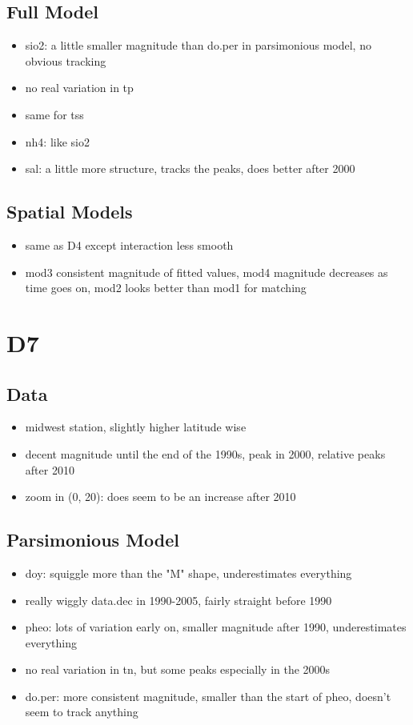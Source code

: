 \documentclass[12pt]{amsart}
\begin{document}
\subsection{Full Model}
\begin{itemize}
\item sio2: a little smaller magnitude than do.per in parsimonious model, no obvious tracking
\item no real variation in tp
\item same for tss
\item nh4: like sio2
\item sal: a little more structure, tracks the peaks, does better after 2000
\end{itemize}

\subsection{Spatial Models}

\begin{itemize}
\item same as D4 except interaction less smooth
\item mod3 consistent magnitude of fitted values, mod4 magnitude decreases as time goes on, mod2 looks better than mod1 for matching
\end{itemize}

\section{D7}
\subsection{Data}
\begin{itemize}
\item midwest station, slightly higher latitude wise
\item decent magnitude until the end of the 1990s, peak in 2000, relative peaks after 2010
\item zoom in (0, 20): does seem to be an increase after 2010
\end{itemize}
\subsection{Parsimonious Model}
\begin{itemize}
\item doy: squiggle more than the "M" shape, underestimates everything
\item really wiggly data.dec in 1990-2005, fairly straight before 1990
\item pheo: lots of variation early on, smaller magnitude after 1990, underestimates everything
\item no real variation in tn, but some peaks especially in the 2000s
\item  do.per: more consistent magnitude, smaller than the start of pheo, doesn't seem to track anything
\end{itemize}
\end{document}
